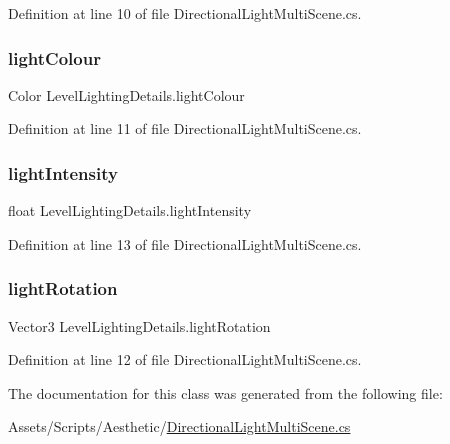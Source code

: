 Definition at line 10 of file Directional\+Light\+Multi\+Scene.\+cs.

\mbox{\label{class_level_lighting_details_abdef512d28a859fe2b220a9564bc3cb3}} 
\subsubsection{\texorpdfstring{light\+Colour}{lightColour}}
{\footnotesize\ttfamily Color Level\+Lighting\+Details.\+light\+Colour}



Definition at line 11 of file Directional\+Light\+Multi\+Scene.\+cs.

\mbox{\label{class_level_lighting_details_a31bb81f833ada29e3202af922c2e85c1}} 
\subsubsection{\texorpdfstring{light\+Intensity}{lightIntensity}}
{\footnotesize\ttfamily float Level\+Lighting\+Details.\+light\+Intensity}



Definition at line 13 of file Directional\+Light\+Multi\+Scene.\+cs.

\mbox{\label{class_level_lighting_details_a0449aa3fb9c9eb97d21cdcb370861b70}} 
\subsubsection{\texorpdfstring{light\+Rotation}{lightRotation}}
{\footnotesize\ttfamily Vector3 Level\+Lighting\+Details.\+light\+Rotation}



Definition at line 12 of file Directional\+Light\+Multi\+Scene.\+cs.



The documentation for this class was generated from the following file\+:\begin{DoxyCompactItemize}
\item 
Assets/\+Scripts/\+Aesthetic/\mbox{\hyperlink{_directional_light_multi_scene_8cs}{Directional\+Light\+Multi\+Scene.\+cs}}\end{DoxyCompactItemize}
